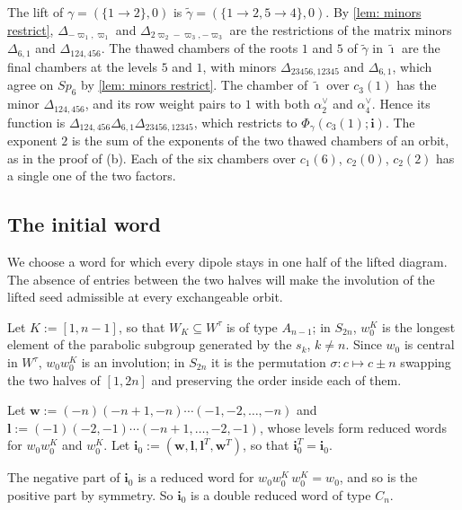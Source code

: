 \documentclass[a4paper]{amsart}
\numberwithin{equation}{section}
\theoremstyle{definition}
\theoremstyle{remark}
\newcommand{\bfi}{\mathbf{i}}
\newcommand{\tbfi}{\widetilde{\boldsymbol{\imath}}}
\newcommand{\tg}{\widetilde{\gamma}}
\begin{document}
\begin{example}
  The lift of $\gamma=(\{1\to2\},0)$ is $\tg=(\{1\to2,5\to4\},0)$.
  By \cref{lem: minors restrict}, $\Delta_{-\varpi_1,\varpi_1}$ and $\Delta_{2\varpi_2-\varpi_3,-\varpi_3}$ are the restrictions of the matrix minors $\Delta_{6,1}$ and $\Delta_{124,456}$.
  The thawed chambers of the roots $1$ and $5$ of $\tg$ in $\tbfi$ are the final chambers at the levels $5$ and $1$, with minors $\Delta_{23456,12345}$ and $\Delta_{6,1}$, which agree on $Sp_6$ by \cref{lem: minors restrict}.
  The chamber of $\tbfi$ over $c_3(1)$ has the minor $\Delta_{124,456}$, and its row weight pairs to $1$ with both $\alpha_2^\vee$ and $\alpha_4^\vee$.
  Hence its function is $\Delta_{124,456}\Delta_{6,1}\Delta_{23456,12345}$, which restricts to $\Phi_\gamma(c_3(1);\bfi)$.
  The exponent $2$ is the sum of the exponents of the two thawed chambers of an orbit, as in the proof of (b).
  Each of the six chambers over $c_1(6)$, $c_2(0)$, $c_2(2)$ has a single one of the two factors.
\end{example}

\subsection{The initial word}
We choose a word for which every dipole stays in one half of the lifted diagram.
The absence of entries between the two halves will make the involution of the lifted seed admissible at every exchangeable orbit.

Let $K:=[1,n-1]$, so that $W_K\subseteq W^\tau$ is of type $A_{n-1}$; in $S_{2n}$, $w_0^K$ is the longest element of the parabolic subgroup generated by the $s_k$, $k\neq n$.
Since $w_0$ is central in $W^\tau$, $w_0w_0^K$ is an involution; in $S_{2n}$ it is the permutation $\sigma:c\mapsto c\pm n$ swapping the two halves of $[1,2n]$ and preserving the order inside each of them.

\begin{definition}
  \label{def: split}
  Let $\mathbf w:=(-n)(-n+1,-n)\cdots(-1,-2,\dots,-n)$ and $\mathbf l:=(-1)(-2,-1)\cdots(-n+1,\dots,-2,-1)$, whose levels form reduced words for $w_0w_0^K$ and $w_0^K$.
  Let $\bfi_0:=(\mathbf w,\mathbf l,\mathbf l^T,\mathbf w^T)$, so that $\bfi_0^T=\bfi_0$.
\end{definition}

The negative part of $\bfi_0$ is a reduced word for $w_0w_0^K\,w_0^K=w_0$, and so is the positive part by symmetry.
  So $\bfi_0$ is a double reduced word of type $C_n$.
\end{document}

